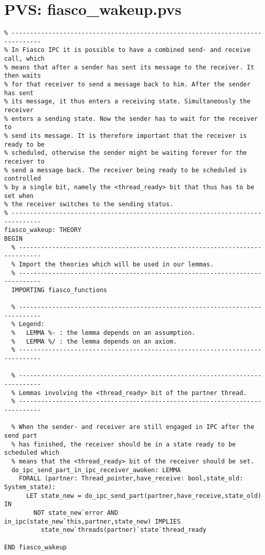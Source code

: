 \hypertarget{pvs_fiasco_wakeup}{\chapter{PVS: fiasco\_wakeup.pvs}}
\lstset{language=PVS}
\begin{lstlisting}
% ------------------------------------------------------------------------------
% In Fiasco IPC it is possible to have a combined send- and receive call, which
% means that after a sender has sent its message to the receiver. It then waits
% for that receiver to send a message back to him. After the sender has sent
% its message, it thus enters a receiving state. Simultaneously the receiver 
% enters a sending state. Now the sender has to wait for the receiver to
% send its message. It is therefore important that the receiver is ready to be
% scheduled, otherwise the sender might be waiting forever for the receiver to 
% send a message back. The receiver being ready to be scheduled is controlled
% by a single bit, namely the <thread_ready> bit that thus has to be set when
% the receiver switches to the sending status.
% ------------------------------------------------------------------------------
fiasco_wakeup: THEORY
BEGIN
  % ----------------------------------------------------------------------------
  % Import the theories which will be used in our lemmas.
  % ----------------------------------------------------------------------------
  IMPORTING fiasco_functions
  
  % ----------------------------------------------------------------------------
  % Legend:
  %   LEMMA %- : the lemma depends on an assumption.
  %   LEMMA %/ : the lemma depends on an axiom.
  % ----------------------------------------------------------------------------

  % ----------------------------------------------------------------------------
  % Lemmas involving the <thread_ready> bit of the partner thread.
  % ----------------------------------------------------------------------------

  % When the sender- and receiver are still engaged in IPC after the send part
  % has finished, the receiver should be in a state ready to be scheduled which
  % means that the <thread_ready> bit of the receiver should be set.
  do_ipc_send_part_in_ipc_receiver_awoken: LEMMA
    FORALL (partner: Thread_pointer,have_receive: bool,state_old: System_state):
      LET state_new = do_ipc_send_part(partner,have_receive,state_old) IN
        NOT state_new`error AND in_ipc(state_new`this,partner,state_new) IMPLIES
          state_new`threads(partner)`state`thread_ready  

END fiasco_wakeup
\end{lstlisting}
